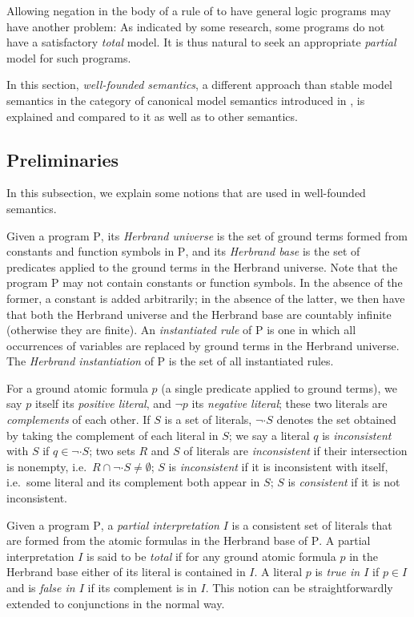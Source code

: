 Allowing negation in the body of a rule of to have general logic programs may have another problem: As indicated by some research, some programs do not have a satisfactory \emph{total} model. It is thus natural to seek an appropriate \emph{partial} model for such programs.

In this section, \emph{well-founded semantics}, a different approach than stable model semantics in the category of canonical model semantics introduced in \cite{VanGelder}, is explained and compared to it as well as to other semantics.

\subsection{Preliminaries}
In this subsection, we explain some notions that are used in well-founded semantics.

Given a program $\mathrm{P}$, its \emph{Herbrand universe} is the set of ground terms formed from constants and function symbols in $\mathrm{P}$, and its \emph{Herbrand base} is the set of predicates applied to the ground terms in the Herbrand universe. Note that the program $\mathrm{P}$ may not contain constants or function symbols. In the absence of the former, a constant is added arbitrarily; in the absence of the latter, we then have that both the Herbrand universe and the Herbrand base are countably infinite (otherwise they are finite). An \emph{instantiated rule} of $\mathrm{P}$ is one in which all occurrences of variables are replaced by ground terms in the Herbrand universe. The \emph{Herbrand instantiation} of $\mathrm{P}$ is the set of all instantiated rules.

For a ground atomic formula $p$ (a single predicate applied to ground terms), we say $p$ itself its \emph{positive literal}, and $\neg p$ its \emph{negative literal}; these two literals are \emph{complements} of each other. If $S$ is a set of literals, $\neg \cdot S$ denotes the set obtained by taking the complement of each literal in $S$; we say a literal $q$ is \emph{inconsistent} with $S$ if $q \in \neg \cdot S$; two sets $R$ and $S$ of literals are \emph{inconsistent} if their intersection is nonempty, i.e.\ $R \cap \neg \cdot S \neq \emptyset$; $S$ is \emph{inconsistent} if it is inconsistent with itself, i.e.\ some literal and its complement both appear in $S$; $S$ is \emph{consistent} if it is not inconsistent.

Given a program $\mathrm{P}$, a \emph{partial interpretation} $I$ is a consistent set of literals that are formed from the atomic formulas in the Herbrand base of $\mathrm{P}$. A partial interpretation $I$ is said to be \emph{total} if for any ground atomic formula $p$ in the Herbrand base either of its literal is contained in $I$. A literal $p$ is \emph{true in $I$} if $p \in I$ and is \emph{false in $I$} if its complement is in $I$. This notion can be straightforwardly extended to conjunctions in the normal way.

